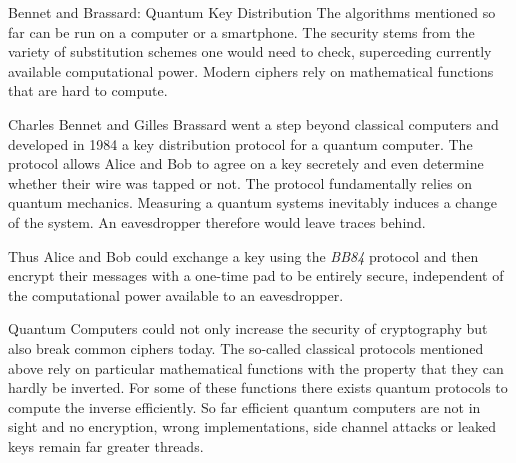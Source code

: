 \documentclass[final,hyperref={pdfpagelabels=false}]{beamer}
\begin{document}
\begin{frame}{}
\begin{columns}[t]
\begin{column}{.3\linewidth}
        \begin{block}{Bennet and Brassard: Quantum Key Distribution}
          The algorithms mentioned so far can be run on a computer or a smartphone. The security stems from the variety of substitution schemes one would need to check, superceding currently available computational power. Modern ciphers rely on mathematical functions that are hard to compute. \par 
          Charles Bennet and Gilles Brassard went a step beyond classical computers and developed in 1984 a key distribution protocol for a quantum computer. The protocol allows Alice and Bob to agree on a key secretely and even determine whether their wire was tapped or not. The protocol fundamentally relies on quantum mechanics. Measuring a quantum systems inevitably induces a change of the system. An eavesdropper therefore would leave traces behind. \par
          Thus Alice and Bob could exchange a key using the {\em BB84} protocol and then encrypt their messages with a one-time pad to be entirely secure, independent of the computational power available to an eavesdropper. \par
          Quantum Computers could not only increase the security of cryptography but also break common ciphers today. The so-called classical protocols mentioned above rely on particular mathematical functions with the property that they can hardly be inverted. For some of these functions there exists quantum protocols to compute the inverse efficiently. So far efficient quantum computers are not in sight and no encryption, wrong implementations, side channel attacks or leaked keys remain far greater threads.
        \end{block}
      \end{column}
    \end{columns}
  \end{frame}
\end{document}
